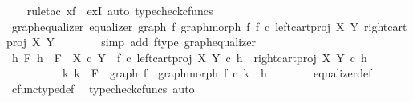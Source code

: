 \begin{isabellebody}
\ \ \isamarkupfalse%
\ {\isacharparenleft}{\kern0pt}rule{\isacharunderscore}{\kern0pt}tac\ x{\isacharequal}{\kern0pt}f\ \ exI{\isacharcomma}{\kern0pt}\ auto{\isacharcomma}{\kern0pt}\ typecheck{\isacharunderscore}{\kern0pt}cfuncs{\isacharparenright}{\kern0pt}\isanewline
\ \ \ \ \isamarkupfalse%
\ graph{\isacharunderscore}{\kern0pt}equalizer{\isacharcolon}{\kern0pt}\ {\isachardoublequoteopen}equalizer\ {\isacharparenleft}{\kern0pt}graph\ f{\isacharparenright}{\kern0pt}\ {\isacharparenleft}{\kern0pt}graph{\isacharunderscore}{\kern0pt}morph\ f{\isacharparenright}{\kern0pt}\ {\isacharparenleft}{\kern0pt}f\ {\isasymcirc}\isactrlsub c\ left{\isacharunderscore}{\kern0pt}cart{\isacharunderscore}{\kern0pt}proj\ X\ Y{\isacharparenright}{\kern0pt}\ {\isacharparenleft}{\kern0pt}right{\isacharunderscore}{\kern0pt}cart{\isacharunderscore}{\kern0pt}proj\ X\ Y{\isacharparenright}{\kern0pt}{\isachardoublequoteclose}\isanewline
\ \ \ \ \ \ \isamarkupfalse%
\ {\isacharparenleft}{\kern0pt}simp\ add{\isacharcolon}{\kern0pt}\ f{\isacharunderscore}{\kern0pt}type\ graph{\isacharunderscore}{\kern0pt}equalizer{}{\isacharparenright}{\kern0pt}\isanewline
\ \ \ \ \isamarkupfalse%
\ \isamarkupfalse%
\ {\isachardoublequoteopen}{\isasymforall}h\ F{\isachardot}{\kern0pt}\ h\ {\isacharcolon}{\kern0pt}\ F\ {\isasymrightarrow}\ X\ {\isasymtimes}\isactrlsub c\ Y\ {\isasymand}\ {\isacharparenleft}{\kern0pt}f\ {\isasymcirc}\isactrlsub c\ left{\isacharunderscore}{\kern0pt}cart{\isacharunderscore}{\kern0pt}proj\ X\ Y{\isacharparenright}{\kern0pt}\ {\isasymcirc}\isactrlsub c\ h\ {\isacharequal}{\kern0pt}\ right{\isacharunderscore}{\kern0pt}cart{\isacharunderscore}{\kern0pt}proj\ X\ Y\ {\isasymcirc}\isactrlsub c\ h\ {\isasymlongrightarrow}\isanewline
\ \ \ \ \ \ \ \ \ \ {\isacharparenleft}{\kern0pt}{\isasymexists}{\isacharbang}{\kern0pt}k{\isachardot}{\kern0pt}\ k\ {\isacharcolon}{\kern0pt}\ F\ {\isasymrightarrow}\ graph\ f\ {\isasymand}\ graph{\isacharunderscore}{\kern0pt}morph\ f\ {\isasymcirc}\isactrlsub c\ k\ {\isacharequal}{\kern0pt}\ h{\isacharparenright}{\kern0pt}{\isachardoublequoteclose}\isanewline
\ \ \ \ \ \ \isamarkupfalse%
\ equalizer{\isacharunderscore}{\kern0pt}def\ \isamarkupfalse%
\ cfunc{\isacharunderscore}{\kern0pt}type{\isacharunderscore}{\kern0pt}def\ \isamarkupfalse%
\ {\isacharparenleft}{\kern0pt}typecheck{\isacharunderscore}{\kern0pt}cfuncs{\isacharcomma}{\kern0pt}\ auto{\isacharparenright}{\kern0pt}\isanewline

\end{isabellebody}
